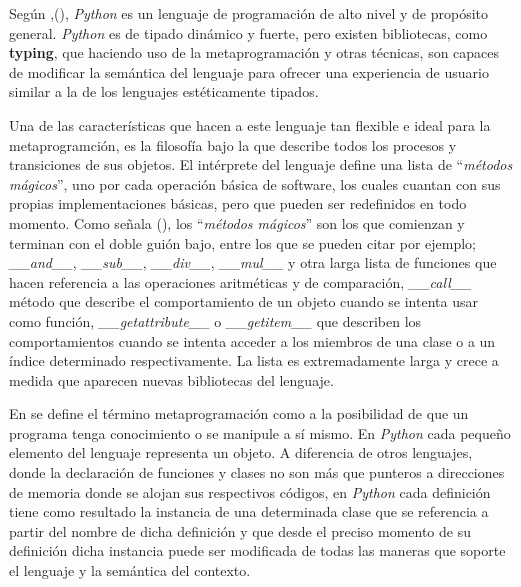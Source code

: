 Según ,(\cite{python}), {\it Python} es un lenguaje de programación de alto nivel y de propósito general.
    {\it Python} es de tipado dinámico y fuerte, pero existen bibliotecas, como {\bf typing}, que haciendo
uso de la metaprogramación y otras técnicas, son capaces de modificar la semántica del
lenguaje para ofrecer una experiencia de usuario similar a la de los lenguajes estéticamente
tipados.

Una de las características que hacen a este lenguaje tan flexible e ideal para la metaprogramción,
es la filosofía bajo la que describe todos los procesos y transiciones de sus objetos. El
intérprete del lenguaje define una lista de ``{\it métodos mágicos}'', uno por cada operación básica
de software, los cuales cuantan con sus propias implementaciones básicas, pero que pueden ser
redefinidos en todo momento. Como señala (\cite{python}), los ``{\it métodos mágicos}'' son los que comienzan y
terminan con el doble guión bajo, entre los que se pueden citar por ejemplo;
{\it \_\_and\_\_}, {\it \_\_sub\_\_}, {\it \_\_div\_\_}, {\it \_\_mul\_\_} y otra larga lista de funciones que hacen referencia
a las operaciones aritméticas y de comparación, {\it\_\_call\_\_} método que describe el comportamiento
de un objeto cuando se intenta usar como función, {\it \_\_getattribute\_\_} o {\it \_\_getitem\_\_}
que describen los comportamientos cuando se intenta acceder a los miembros de una clase o a
un índice determinado respectivamente. La lista es extremadamente larga y crece a medida
que aparecen nuevas bibliotecas del lenguaje.

En \cite{python} se define el término metaprogramación como a la posibilidad de que un programa tenga
conocimiento o se manipule a sí mismo. En {\it Python} cada pequeño elemento del lenguaje
representa un objeto. A diferencia de otros lenguajes, donde la declaración de funciones y
clases no son más que punteros a direcciones de memoria donde se alojan sus respectivos códigos,
en {\it Python} cada definición tiene como resultado la instancia de una determinada clase que se
referencia a partir del nombre de dicha definición y que desde el preciso momento de su
definición dicha instancia puede ser modificada de todas las maneras que soporte el lenguaje
y la semántica del contexto.

